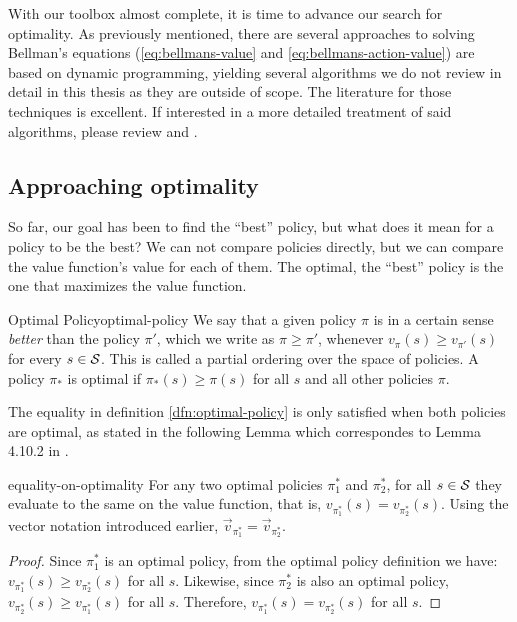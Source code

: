 With our toolbox almost complete, it is time to advance our search for
optimality. As previously mentioned, there are several approaches to solving
Bellman's equations (\eqref{eq:bellmans-value} and
\eqref{eq:bellmans-action-value}) are based on dynamic programming, yielding
several algorithms we do not review in detail in this thesis as they are outside
of scope. The literature for those techniques is excellent. If interested in a
more detailed treatment of said algorithms, please review \cite{SuttonBarto} and
\cite{raoRL4F}.

\subsection{Approaching optimality}

So far, our goal has been to find the ``best'' policy, but what does it mean for
a policy to be the best? We can not compare policies directly, but we can
compare the value function's value for each of them. The optimal, the
``best'' policy is the one that maximizes the value function.

\begin{dfn}{Optimal Policy}{optimal-policy}
    We say that a given policy $\pi$ is in a certain sense \textit{better} than
    the policy $\pi'$, which we write as $\pi \geq \pi'$, whenever $v_\pi(s)
    \geq v_{\pi'} (s)$ for every $s \in \mathcal{S}$. This is called a partial
    ordering over the space of policies. A policy $\pi_*$ is optimal if
    $\pi_*(s) \geq \pi (s)$ for all $s$ and all other policies $\pi$.
\end{dfn}

The equality in definition \ref{dfn:optimal-policy} is only satisfied when both
policies are optimal, as stated in the following Lemma which correspondes to Lemma 4.10.2 in \cite[pg.~115]{raoRL4F}.

\begin{lemma}{}{equality-on-optimality}
    For any two optimal policies $\pi^{*}_{1}$ and $\pi^{*}_{2}$, for all $s \in
    \mathcal{S}$ they evaluate to the same on the value function, that is,
    $v_{\pi^{*}_{1}} (s) = v_{\pi^{*}_{2}} (s)$.  Using the vector notation
    introduced earlier, $\vec{v}_{\pi_{1}^{*}} = \vec{v}_{\pi_{2}^{*}}$.
\end{lemma}

\begin{proof}
    Since $\pi_{1}^{*}$ is an optimal policy, from the optimal policy definition
    we have: $v_{\pi_{1}^{*}}(s) \geq v_{\pi_{2}^{*}} (s)$ for all $s$.
    Likewise, since $\pi_{2}^{*}$ is also an optimal policy, $v_{\pi_{2}^{*}}(s)
    \geq v_{\pi_{1}^{*}} (s)$ for all $s$. Therefore, $v_{\pi_{1}^{*}}(s) =
    v_{\pi_{2}^{*}} (s)$ for all $s$.
\end{proof}

